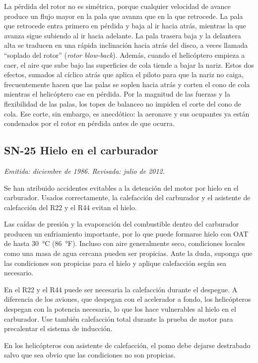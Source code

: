La pérdida del rotor no es simétrica, porque cualquier velocidad de avance produce un flujo mayor en la pala que avanza que en la que retrocede. La pala que retrocede entra primero en pérdida y baja al ir hacia atrás, mientras la que avanza sigue subiendo al ir hacia adelante. La pala trasera baja y la delantera alta se traducen en una rápida inclinación hacia atrás del disco, a veces llamada ``soplado del rotor'' (\emph{rotor blow-back}). Además, cuando el helicóptero empieza a caer, el aire que sube bajo las superficies de cola tiende a bajar la nariz. Estos dos efectos, sumados al cíclico atrás que aplica el piloto para que la nariz no caiga, frecuentemente hacen que las palas se soplen hacia atrás y corten el cono de cola mientras el helicóptero cae en pérdida. Por la magnitud de las fuerzas y la flexibilidad de las palas, los topes de balanceo no impiden el corte del cono de cola. Ese corte, sin embargo, es anecdótico: la aeronave y sus ocupantes ya están condenados por el rotor en pérdida antes de que ocurra.

\subsection*{SN-25 \quad Hielo en el carburador}
{\small\textit{Emitida: diciembre de 1986. Revisada: julio de 2012.}}

Se han atribuido accidentes evitables a la detención del motor por hielo en el carburador. Usados correctamente, la calefacción del carburador y el asistente de calefacción del R22 y el R44 evitan el hielo.

Las caídas de presión y la evaporación del combustible dentro del carburador producen un enfriamiento importante, por lo que puede formarse hielo con OAT de hasta 30~°C (86~°F). Incluso con aire generalmente seco, condiciones locales como una masa de agua cercana pueden ser propicias. Ante la duda, suponga que las condiciones son propicias para el hielo y aplique calefacción según sea necesario.

En el R22 y el R44 puede ser necesaria la calefacción durante el despegue. A diferencia de los aviones, que despegan con el acelerador a fondo, los helicópteros despegan con la potencia necesaria, lo que los hace vulnerables al hielo en el carburador. Use también calefacción total durante la prueba de motor para precalentar el sistema de inducción.

En los helicópteros con asistente de calefacción, el pomo debe dejarse destrabado salvo que sea obvio que las condiciones no son propicias.

